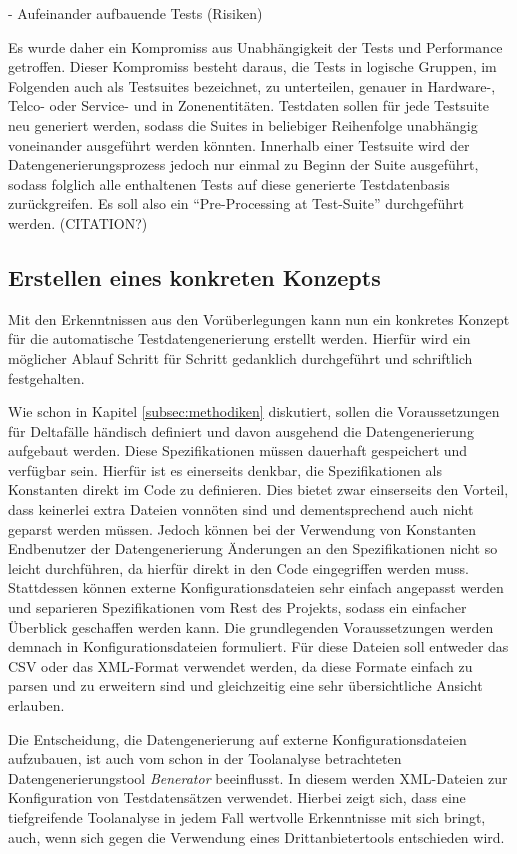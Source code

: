 \cite[S. 165]{witte:2019} - Aufeinander aufbauende Tests (Risiken)

Es wurde daher ein Kompromiss aus Unabhängigkeit der Tests und Performance getroffen. Dieser Kompromiss besteht daraus, die Tests in logische Gruppen, im Folgenden auch als Testsuites bezeichnet, zu unterteilen, genauer in Hardware-, Telco- oder Service- und in Zonenentitäten. Testdaten sollen für jede Testsuite neu generiert werden, sodass die Suites in beliebiger Reihenfolge unabhängig voneinander ausgeführt werden könnten. Innerhalb einer Testsuite wird der Datengenerierungsprozess jedoch nur einmal zu Beginn der Suite ausgeführt, sodass folglich alle enthaltenen Tests auf diese generierte Testdatenbasis zurückgreifen. Es soll also ein \enquote{Pre-Processing at Test-Suite} durchgeführt werden. (CITATION?)

\subsection{Erstellen eines konkreten Konzepts}\label{subsec:konzept}
Mit den Erkenntnissen aus den Vorüberlegungen kann nun ein konkretes Konzept für die automatische Testdatengenerierung erstellt werden. Hierfür wird ein möglicher Ablauf Schritt für Schritt gedanklich durchgeführt und schriftlich festgehalten.

Wie schon in Kapitel \ref{subsec:methodiken} diskutiert, sollen die Voraussetzungen für Deltafälle händisch definiert und davon ausgehend die Datengenerierung aufgebaut werden. Diese Spezifikationen müssen dauerhaft gespeichert und verfügbar sein. Hierfür ist es einerseits denkbar, die Spezifikationen als Konstanten direkt im Code zu definieren. Dies bietet zwar einserseits den Vorteil, dass keinerlei extra Dateien vonnöten sind und dementsprechend auch nicht geparst werden müssen. Jedoch können bei der Verwendung von Konstanten Endbenutzer der Datengenerierung Änderungen an den Spezifikationen nicht so leicht durchführen, da hierfür direkt in den Code eingegriffen werden muss. Stattdessen können externe Konfigurationsdateien sehr einfach angepasst werden und separieren Spezifikationen vom Rest des Projekts, sodass ein einfacher Überblick geschaffen werden kann. Die grundlegenden Voraussetzungen werden demnach in Konfigurationsdateien formuliert. Für diese Dateien soll entweder das \ac{CSV} oder das \ac{XML}-Format verwendet werden, da diese Formate einfach zu parsen und zu erweitern sind und gleichzeitig eine sehr übersichtliche Ansicht erlauben.

Die Entscheidung, die Datengenerierung auf externe Konfigurationsdateien aufzubauen, ist auch vom schon in der Toolanalyse betrachteten Datengenerierungstool \textit{Benerator} beeinflusst. In diesem werden \ac{XML}-Dateien zur Konfiguration von Testdatensätzen verwendet. \cite{benerator:2022} Hierbei zeigt sich, dass eine tiefgreifende Toolanalyse in jedem Fall wertvolle Erkenntnisse mit sich bringt, auch, wenn sich gegen die Verwendung eines Drittanbietertools entschieden wird.

